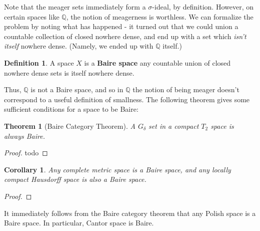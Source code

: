 \documentclass{article}
\theoremstyle{definition}
\newtheorem{definition}{Definition}[section]
\theoremstyle{plain}
\theoremstyle{theorem}
\newtheorem{theorem}{Theorem}[section]
\newtheorem{corollary}{Corollary}[section]
\begin{document}
Note that the meager sets immediately form a $\sigma$-ideal, by definition. However, on certain spaces like $\mathbb{Q}$, the notion of meagerness is worthless. We can formalize the problem by noting what has happened - it turned out that we could union a countable collection of closed nowhere dense, and end up with a set which \textit{isn't itself} nowhere dense. (Namely, we ended up with $\mathbb{Q}$ itself.) 
\begin{definition}
	A space $X$ is a \textbf{Baire space} any countable union of closed nowhere dense sets is itself nowhere dense. 
\end{definition}
Thus, $\mathbb{Q}$ is not a Baire space, and so in $\mathbb{Q}$ the notion of being meager doesn't correspond to a useful definition of smallness. The following theorem gives some sufficient conditions for a space to be Baire:
\begin{theorem}[Baire Category Theorem]
	A $G_{\delta}$ set in a compact $T_2$ space is always Baire.
\end{theorem}
\begin{proof}
	todo
\end{proof}
\begin{corollary}
	Any complete metric space is a Baire space, and any locally compact Hausdorff space is also a Baire space. 
\end{corollary}
\begin{proof}
	
\end{proof}
It immediately follows from the Baire category theorem that any Polish space is a Baire space. In particular, Cantor space is Baire. 
\end{document}

